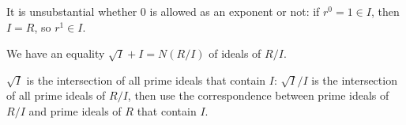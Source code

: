 It is unsubstantial whether $0$ is allowed as an exponent or not: if
$r^0 = 1 \in I$, then $I = R$, so $r^1 \in I$.

We have an equality  $\sqrt{I} + I = N(R/I)$ of ideals of $R/I$.

$\sqrt{I}$ is the intersection of all prime ideals that contain $I$:
$\sqrt{I}/I$ is the intersection of all prime ideals of $R/I$, then use the
correspondence between prime ideals of $R/I$ and prime ideals of $R$ that
contain $I$.
